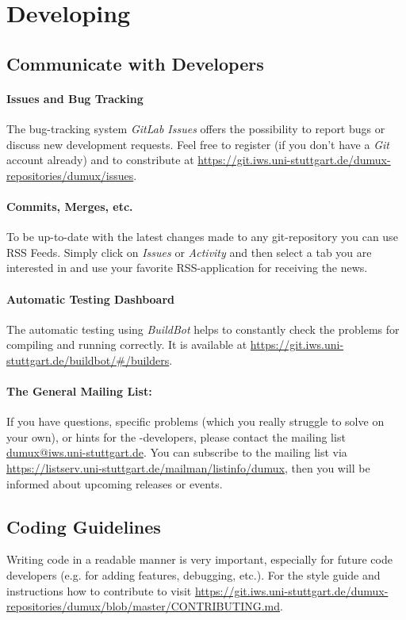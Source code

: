 \section{Developing \Dumux}
\label{sc_developingdumux}

\subsection{Communicate with \Dumux Developers}

\paragraph{Issues and Bug Tracking}
The bug-tracking system \emph{GitLab Issues} offers the possibility to report bugs or discuss new development requests.
Feel free to register (if you don't have a \emph{Git} account already) and to constribute
at \url{https://git.iws.uni-stuttgart.de/dumux-repositories/dumux/issues}.

\paragraph{Commits, Merges, etc.}
To be up-to-date with the latest changes made to any git-repository you can use RSS Feeds.
Simply click on \emph{Issues} or \emph{Activity} and then select a tab you are interested in
and use your favorite RSS-application for receiving the news.

\paragraph{Automatic Testing Dashboard}
The automatic testing using \emph{BuildBot} helps to constantly check the
\Dumux problems for compiling and running correctly. It is available at
\url{https://git.iws.uni-stuttgart.de/buildbot/#/builders}.

\paragraph{The General Mailing List:}
If you have questions, specific problems (which you really struggle to solve on your own),
or hints for the \Dumux-developers, please contact the mailing list \url{dumux@iws.uni-stuttgart.de}.
You can subscribe to the mailing list via
\url{https://listserv.uni-stuttgart.de/mailman/listinfo/dumux}, then you
will be informed about upcoming releases or events.

\subsection{Coding Guidelines}
Writing code in a readable manner is very important, especially
for future code developers (e.g. for adding features, debugging, etc.).
For the style guide and instructions how to contribute to \Dumux visit
\url{https://git.iws.uni-stuttgart.de/dumux-repositories/dumux/blob/master/CONTRIBUTING.md}.


